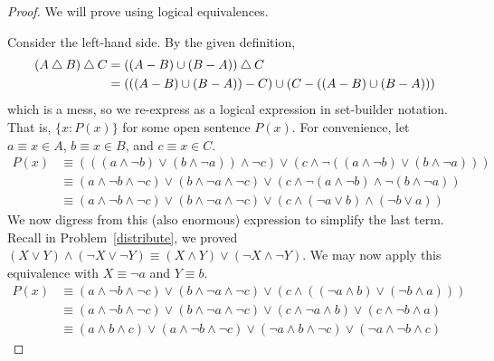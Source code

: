 \begin{proof}
  We will prove using logical equivalences.

  Consider the left-hand side. By the given definition,
  \begin{align*}
    (A \mathbin{\triangle} B) \mathbin{\triangle} C & = ((A-B) \cup (B-A)) \mathbin{\triangle} C                              \\
                      & = (((A-B) \cup (B-A)) - C) \cup (C - ((A-B) \cup (B-A)))
  \end{align*}
  which is a mess, so we re-express as a logical expression in set-builder notation.
  That is, $\{ x : P(x) \}$ for some open sentence $P(x)$.
  For convenience, let $a \equiv x\in A$, $b \equiv x\in B$, and $c \equiv x\in C$.
  \begin{align*}
    P(x)
     & \equiv (((a \land \lnot b) \lor (b \land \lnot a)) \land \lnot c)
    \lor (c \land \lnot((a \land \lnot b) \lor (b \land \lnot a)))                 \\
     & \equiv (a \land \lnot b \land \lnot c) \lor (b \land \lnot a \land \lnot c)
    \lor (c \land \lnot(a \land \lnot b) \land \lnot(b \land \lnot a))             \\
     & \equiv (a \land \lnot b \land \lnot c) \lor (b \land \lnot a \land \lnot c)
    \lor (c \land (\lnot a \lor b) \land (\lnot b \lor a))
  \end{align*}
  We now digress from this (also enormous) expression to simplify the last term.
  Recall in Problem~\ref{distribute}, we proved
  $(X \lor Y) \land (\lnot X \lor \lnot Y) \equiv (X \land Y) \lor (\lnot X \land \lnot Y)$.
  We may now apply this equivalence with $X\equiv\lnot a$ and $Y\equiv b$.
  \begin{align*}
    P(x)
     & \equiv (a \land \lnot b \land \lnot c) \lor (b \land \lnot a \land \lnot c)
    \lor (c \land ((\lnot a \land b) \lor (\lnot b \land a)))                      \\
     & \equiv (a \land \lnot b \land \lnot c) \lor (b \land \lnot a \land \lnot c)
    \lor (c \land \lnot a \land b) \lor (c \land \lnot b \land a)                  \\
     & \equiv (a \land b \land c) \lor (a \land \lnot b \land \lnot c)
    \lor (\lnot a \land b \land \lnot c) \lor (\lnot a \land \lnot b \land c)
  \end{align*}


\end{proof}
